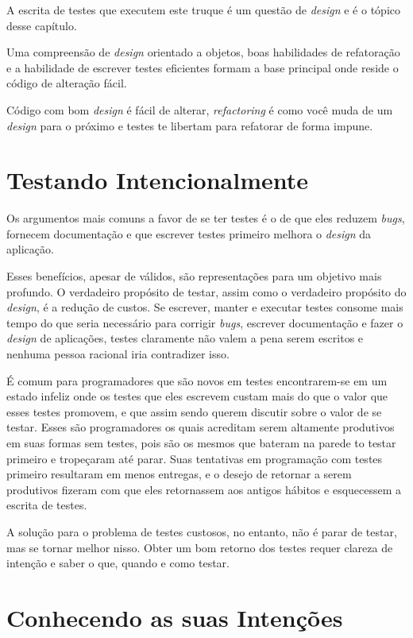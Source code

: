 A escrita de testes que executem este truque é um questão de \textit{design} e é o tópico desse capítulo.

Uma compreensão de \textit{design} orientado a objetos, boas habilidades de refatoração e a habilidade de escrever testes eficientes formam a base principal onde reside o código de alteração fácil.

Código com bom \textit{design} é fácil de alterar, \textit{refactoring} é como você muda de um \textit{design} para o próximo e testes te libertam para refatorar de forma impune.

\section{Testando Intencionalmente}

Os argumentos mais comuns a favor de se ter testes é o de que eles reduzem \textit{bugs}, fornecem documentação e que escrever testes primeiro melhora o \textit{design} da aplicação.

Esses benefícios, apesar de válidos, são representações para um objetivo mais profundo. O verdadeiro propósito de testar, assim como o verdadeiro propósito do \textit{design}, é a redução de custos. Se escrever, manter e executar testes consome mais tempo do que seria necessário para corrigir \textit{bugs}, escrever documentação e fazer o \textit{design} de aplicações, testes claramente não valem a pena serem escritos e nenhuma pessoa racional iria contradizer isso.

É comum para programadores que são novos em testes encontrarem-se em um estado infeliz onde os testes que eles escrevem custam mais do que o valor que esses testes promovem, e que assim sendo querem discutir sobre o valor de se testar. Esses são programadores os quais acreditam serem altamente produtivos em suas formas sem testes, pois são os mesmos que bateram na parede to testar primeiro e tropeçaram até parar. Suas tentativas em programação com testes primeiro resultaram em menos entregas, e o desejo de retornar a serem produtivos fizeram com que eles retornassem aos antigos hábitos e esquecessem a escrita de testes.

A solução para o problema de testes custosos, no entanto, não é parar de testar, mas se tornar melhor nisso. Obter um bom retorno dos testes requer clareza de intenção e saber o que, quando e como testar.

\section{Conhecendo as suas Intenções}

